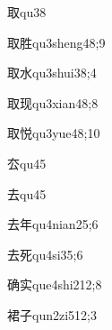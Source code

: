 \begin{verbete}{取}{qu3}{8}
\end{verbete}

\begin{verbete}{取胜}{qu3sheng4}{8;9}
\end{verbete}

\begin{verbete}{取水}{qu3shui3}{8;4}
\end{verbete}

\begin{verbete}{取现}{qu3xian4}{8;8}
\end{verbete}

\begin{verbete}{取悦}{qu3yue4}{8;10}
\end{verbete}

\begin{verbete}{厺}{qu4}{5}
\end{verbete}

\begin{verbete}{去}{qu4}{5}
\end{verbete}

\begin{verbete}{去年}{qu4nian2}{5;6}
\end{verbete}

\begin{verbete}{去死}{qu4si3}{5;6}
\end{verbete}

\begin{verbete}{确实}{que4shi2}{12;8}
\end{verbete}

\begin{verbete}{裙子}{qun2zi5}{12;3}
\end{verbete}

